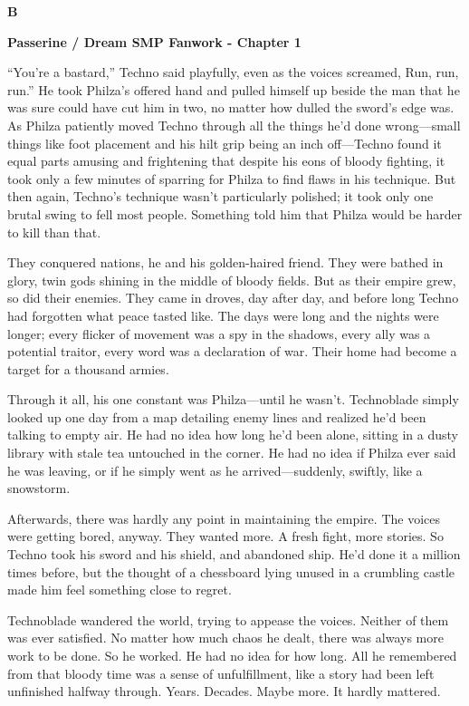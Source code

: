 \documentclass{exam-zh}
\begin{document}
{\centering \bfseries B \par}

{\centering \bfseries Passerine / Dream SMP Fanwork - Chapter 1 \par}

``You're a bastard,'' Techno said playfully, even as the voices screamed, Run, run, run.'' He took Philza's offered hand and pulled himself up beside the man that he was sure could have cut him in two, no matter how dulled the sword's edge was. As Philza patiently moved Techno through all the things he'd done wrong—small things like foot placement and his hilt grip being an inch off—Techno found it equal parts amusing and frightening that despite his eons of bloody fighting, it took only a few minutes of sparring for Philza to find flaws in his technique. But then again, Techno's technique wasn't particularly polished; it took only one brutal swing to fell most people. Something told him that Philza would be harder to kill than that.

They conquered nations, he and his golden-haired friend. They were bathed in glory, twin gods shining in the middle of bloody fields. But as their empire grew, so did their enemies. They came in droves, day after day, and before long Techno had forgotten what peace tasted like. The days were long and the nights were longer; every flicker of movement was a spy in the shadows, every ally was a potential traitor, every word was a declaration of war. Their home had become a target for a thousand armies.

Through it all, his one constant was Philza—until he wasn't. Technoblade simply looked up one day from a map detailing enemy lines and realized he'd been talking to empty air. He had no idea how long he'd been alone, sitting in a dusty library with stale tea untouched in the corner. He had no idea if Philza ever said he was leaving, or if he simply went as he arrived—suddenly, swiftly, like a snowstorm.

Afterwards, there was hardly any point in maintaining the empire. The voices were getting bored, anyway. They wanted more. A fresh fight, more stories. So Techno took his sword and his shield, and abandoned ship. He'd done it a million times before, but the thought of a chessboard lying unused in a crumbling castle made him feel something close to regret.

Technoblade wandered the world, trying to appease the voices. Neither of them was ever satisfied. No matter how much chaos he dealt, there was always more work to be done. So he worked. He had no idea for how long. All he remembered from that bloody time was a sense of unfulfillment, like a story had been left unfinished halfway through. Years. Decades. Maybe more. It hardly mattered.
\end{document}
